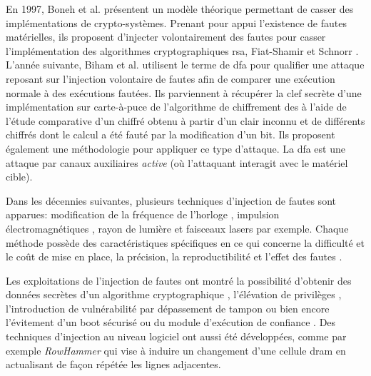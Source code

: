             En 1997, Boneh et al. \cite{Boneh/EUROCRYPT97} présentent un modèle théorique permettant de casser des implémentations de crypto-systèmes. Prenant pour appui l'existence de fautes matérielles, ils proposent d'injecter volontairement des fautes pour casser l'implémentation des algorithmes cryptographiques \gls{rsa}, Fiat-Shamir \cite{Fiat/86} et Schnorr \cite{Schnorr/JC91}.
            L'année suivante, Biham et al. \cite{Biham/AICC97} utilisent le terme de \gls{dfa} pour qualifier une attaque reposant sur l'injection volontaire de fautes afin de comparer une exécution normale à des exécutions fautées. Ils parviennent à récupérer la clef secrète d'une implémentation sur carte-à-puce de l'algorithme de chiffrement \gls{des} à l'aide de l'étude comparative d'un chiffré obtenu à partir d'un clair inconnu et de différents chiffrés dont le calcul a été fauté par la modification d'un bit. Ils proposent également une méthodologie pour appliquer ce type d'attaque. La \gls{dfa} est une attaque par canaux auxiliaires \textit{active} (où l'attaquant interagit avec le matériel cible).
            
            Dans les décennies suivantes, plusieurs techniques d'injection de fautes sont apparues: modification de la fréquence de l'horloge \cite{Agoyan/SCRAA10, Yuce/HSS18}, impulsion électromagnétiques \cite{Poucheret/FDTC11}, rayon de lumière \cite{Skorobogatov/CHES02} et faisceaux lasers \cite{Roscian/FDTC13, Colombier/HOST19} par exemple. Chaque méthode possède des caractéristiques spécifiques en ce qui concerne la difficulté et le coût de mise en place, la précision, la reproductibilité et l'effet des fautes \cite{BarEl/IEEE06}.
            
            \begin{sloppypar}   
            Les exploitations de l'injection de fautes ont montré la possibilité d'obtenir des données secrètes d'un algorithme cryptographique \cite{Boneh/JC01, Biham/AICC97}, l'élévation de privilèges \cite{Timmers/FDTC16}, l'introduction de vulnérabilité par dépassement de tampon \cite{Nashimoto/JCE17, SSTIC20} ou bien encore l'évitement d'un boot sécurisé \cite{Nashimoto/JCE17} ou du module d'exécution de confiance \cite{Nashimoto/IACR22}. Des techniques d'injection au niveau logiciel ont aussi été développées, comme par exemple \textit{RowHammer} \cite{Park/IIRW14} qui vise à induire un changement d'une cellule \gls{dram} en actualisant de façon répétée les lignes adjacentes. 
            \end{sloppypar}   
            
